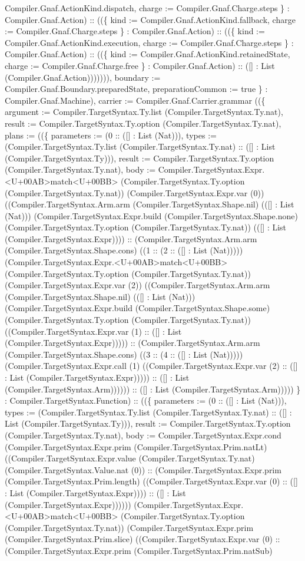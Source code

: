 \documentclass[11pt]{article}
\begin{document}
Compiler.Gnaf.ActionKind.dispatch, charge := Compiler.Gnaf.Charge.steps \} : Compiler.Gnaf.Action) :: ((\{ kind := Compiler.Gnaf.ActionKind.fallback, charge := Compiler.Gnaf.Charge.steps \} : Compiler.Gnaf.Action) :: ((\{ kind := Compiler.Gnaf.ActionKind.execution, charge := Compiler.Gnaf.Charge.steps \} : Compiler.Gnaf.Action) :: ((\{ kind := Compiler.Gnaf.ActionKind.retainedState, charge := Compiler.Gnaf.Charge.free \} : Compiler.Gnaf.Action) :: ([] : List (Compiler.Gnaf.Action))))))), boundary := Compiler.Gnaf.Boundary.preparedState, preparationCommon := true \} : Compiler.Gnaf.Machine), carrier := Compiler.Gnaf.Carrier.grammar ((\{ argument := Compiler.TargetSyntax.Ty.list (Compiler.TargetSyntax.Ty.nat), result := Compiler.TargetSyntax.Ty.option (Compiler.TargetSyntax.Ty.nat), plans := ((\{ parameters := (0 :: ([] : List (Nat))), types := (Compiler.TargetSyntax.Ty.list (Compiler.TargetSyntax.Ty.nat) :: ([] : List (Compiler.TargetSyntax.Ty))), result := Compiler.TargetSyntax.Ty.option (Compiler.TargetSyntax.Ty.nat), body := Compiler.TargetSyntax.Expr.<U+00AB>match<U+00BB> (Compiler.TargetSyntax.Ty.option (Compiler.TargetSyntax.Ty.nat)) (Compiler.TargetSyntax.Expr.var (0)) ((Compiler.TargetSyntax.Arm.arm (Compiler.TargetSyntax.Shape.nil) (([] : List (Nat))) (Compiler.TargetSyntax.Expr.build (Compiler.TargetSyntax.Shape.none) (Compiler.TargetSyntax.Ty.option (Compiler.TargetSyntax.Ty.nat)) (([] : List (Compiler.TargetSyntax.Expr)))) :: (Compiler.TargetSyntax.Arm.arm (Compiler.TargetSyntax.Shape.cons) ((1 :: (2 :: ([] : List (Nat))))) (Compiler.TargetSyntax.Expr.<U+00AB>match<U+00BB> (Compiler.TargetSyntax.Ty.option (Compiler.TargetSyntax.Ty.nat)) (Compiler.TargetSyntax.Expr.var (2)) ((Compiler.TargetSyntax.Arm.arm (Compiler.TargetSyntax.Shape.nil) (([] : List (Nat))) (Compiler.TargetSyntax.Expr.build (Compiler.TargetSyntax.Shape.some) (Compiler.TargetSyntax.Ty.option (Compiler.TargetSyntax.Ty.nat)) ((Compiler.TargetSyntax.Expr.var (1) :: ([] : List (Compiler.TargetSyntax.Expr))))) :: (Compiler.TargetSyntax.Arm.arm (Compiler.TargetSyntax.Shape.cons) ((3 :: (4 :: ([] : List (Nat))))) (Compiler.TargetSyntax.Expr.call (1) ((Compiler.TargetSyntax.Expr.var (2) :: ([] : List (Compiler.TargetSyntax.Expr))))) :: ([] : List (Compiler.TargetSyntax.Arm)))))) :: ([] : List (Compiler.TargetSyntax.Arm))))) \} : Compiler.TargetSyntax.Function) :: ((\{ parameters := (0 :: ([] : List (Nat))), types := (Compiler.TargetSyntax.Ty.list (Compiler.TargetSyntax.Ty.nat) :: ([] : List (Compiler.TargetSyntax.Ty))), result := Compiler.TargetSyntax.Ty.option (Compiler.TargetSyntax.Ty.nat), body := Compiler.TargetSyntax.Expr.cond (Compiler.TargetSyntax.Expr.prim (Compiler.TargetSyntax.Prim.natLt) ((Compiler.TargetSyntax.Expr.value (Compiler.TargetSyntax.Ty.nat) (Compiler.TargetSyntax.Value.nat (0)) :: (Compiler.TargetSyntax.Expr.prim (Compiler.TargetSyntax.Prim.length) ((Compiler.TargetSyntax.Expr.var (0) :: ([] : List (Compiler.TargetSyntax.Expr)))) :: ([] : List (Compiler.TargetSyntax.Expr)))))) (Compiler.TargetSyntax.Expr.<U+00AB>match<U+00BB> (Compiler.TargetSyntax.Ty.option (Compiler.TargetSyntax.Ty.nat)) (Compiler.TargetSyntax.Expr.prim (Compiler.TargetSyntax.Prim.slice) ((Compiler.TargetSyntax.Expr.var (0) :: (Compiler.TargetSyntax.Expr.prim (Compiler.TargetSyntax.Prim.natSub) 
\end{document}
